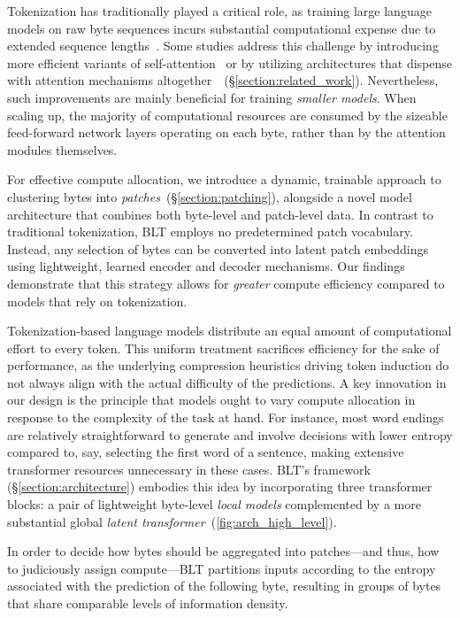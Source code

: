 Tokenization has traditionally played a critical role, as training large language models on raw byte sequences incurs substantial computational expense due to extended sequence lengths~\citep{xue2022byt5}. Some studies address this challenge by introducing more efficient variants of self-attention~\citep{el2020characterbert, clark2022canine} or by utilizing architectures that dispense with attention mechanisms altogether~\citep{wang2024mambabyte}~(\S\ref{section:related_work}). Nevertheless, such improvements are mainly beneficial for training \textit{smaller models}. When scaling up, the majority of computational resources are consumed by the sizeable feed-forward network layers operating on each byte, rather than by the attention modules themselves.

For effective compute allocation, we introduce a dynamic, trainable approach to clustering bytes into \textit{patches}~(\S\ref{section:patching}), alongside a novel model architecture that combines both byte-level and patch-level data. In contrast to traditional tokenization, {\textsc BLT} employs no predetermined patch vocabulary. Instead, any selection of bytes can be converted into latent patch embeddings using lightweight, learned encoder and decoder mechanisms. Our findings demonstrate that this strategy allows for \textit{greater} compute efficiency compared to models that rely on tokenization.

Tokenization-based language models distribute an equal amount of computational effort to every token. This uniform treatment sacrifices efficiency for the sake of performance, as the underlying compression heuristics driving token induction do not always align with the actual difficulty of the predictions. A key innovation in our design is the principle that models ought to vary compute allocation in response to the complexity of the task at hand. For instance, most word endings are relatively straightforward to generate and involve decisions with lower entropy compared to, say, selecting the first word of a sentence, making extensive transformer resources unnecessary in these cases. {\textsc BLT}'s framework (\S\ref{section:architecture}) embodies this idea by incorporating three transformer blocks: a pair of lightweight byte-level \textit{local models} complemented by a more substantial global \textit{latent transformer}~(\autoref{fig:arch_high_level}).

In order to decide how bytes should be aggregated into patches—and thus, how to judiciously assign compute—{\textsc BLT} partitions inputs according to the entropy associated with the prediction of the following byte, resulting in groups of bytes that share comparable levels of information density.

